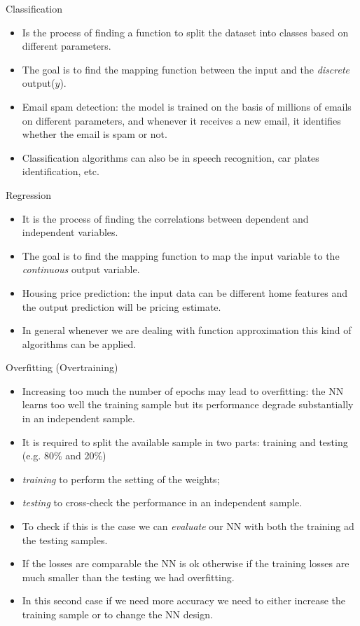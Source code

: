 \documentclass{beamer}
\begin{document}
\begin{frame}{Classification}
  \begin{itemize}
  \item  Is the process of finding a function to split the dataset into classes based on different parameters. 
  \item The goal is to find the mapping function between the input and the \emph{discrete} output($y$).
    \item Email spam detection: the model is trained on the basis of millions of emails on different parameters, and whenever it receives a new email, it identifies whether the email is spam or not.
    \item Classification algorithms can also be in speech recognition, car plates identification, etc.
  \end{itemize}
\end{frame}

\begin{frame}{Regression}
  \begin{itemize}
  \item It is the process of finding the correlations between dependent and independent variables. 
    \item The goal is to find the mapping function to map the input variable to the \emph{continuous} output variable.
    \item Housing price prediction: the input data can be different home features and the output prediction will be pricing estimate. 
    \item In general whenever we are dealing with function approximation this kind of algorithms can be applied.
  \end{itemize}
\end{frame}

\begin{frame}{Overfitting (Overtraining)}
  \begin{itemize}
  \item Increasing too much the number of epochs may lead to overfitting: the NN learns too well the training sample but its performance degrade substantially in an independent sample.
  \item It is required to split the available sample in two parts: training and testing (e.g. 80\% and 20\%) 
  \item \emph{training} to perform the setting of the weights;
  \item \emph{testing} to cross-check the performance in an independent sample. 
  \item To check if this is the case we can \emph{evaluate} our NN with both the training ad the testing samples. 
  \item If the losses are comparable the NN is ok otherwise if the training losses are much smaller than the testing we had overfitting.
  \item In this second case if we need more accuracy we need to either increase the training sample or to change the NN design.
  \end{itemize}
\end{frame}
\end{document}
